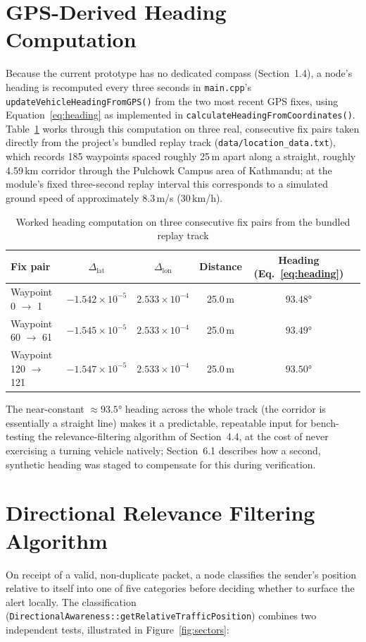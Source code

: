 \documentclass[12pt,a4paper]{report}
\begin{document}
\section{GPS-Derived Heading Computation}
Because the current prototype has no dedicated compass (Section~1.4), a node's heading is recomputed every three seconds in \texttt{main.cpp}'s \texttt{updateVehicleHeadingFromGPS()} from the two most recent GPS fixes, using Equation~\ref{eq:heading} as implemented in \texttt{calculateHeadingFromCoordinates()}. Table~\ref{tab:headingworked} works through this computation on three real, consecutive fix pairs taken directly from the project's bundled replay track (\texttt{data/location\_data.txt}), which records 185 waypoints spaced roughly 25\,m apart along a straight, roughly 4.59\,km corridor through the Pulchowk Campus area of Kathmandu; at the module's fixed three-second replay interval this corresponds to a simulated ground speed of approximately 8.3\,m/s (30\,km/h).

\begin{table}[H]
\centering
\caption{Worked heading computation on three consecutive fix pairs from the bundled replay track}
\label{tab:headingworked}
\begin{tabular}{@{}lccccc@{}}
\toprule
\textbf{Fix pair} & $\Delta_{\text{lat}}$ & $\Delta_{\text{lon}}$ & Distance & Heading (Eq.~\ref{eq:heading}) \\
\midrule
Waypoint 0 $\to$ 1   & $-1.542\times10^{-5}$ & $2.533\times10^{-4}$ & 25.0\,m & $93.48°$ \\
Waypoint 60 $\to$ 61 & $-1.545\times10^{-5}$ & $2.533\times10^{-4}$ & 25.0\,m & $93.49°$ \\
Waypoint 120 $\to$ 121 & $-1.547\times10^{-5}$ & $2.533\times10^{-4}$ & 25.0\,m & $93.50°$ \\
\bottomrule
\end{tabular}
\end{table}

The near-constant $\approx 93.5°$ heading across the whole track (the corridor is essentially a straight line) makes it a predictable, repeatable input for bench-testing the relevance-filtering algorithm of Section~4.4, at the cost of never exercising a turning vehicle natively; Section~6.1 describes how a second, synthetic heading was staged to compensate for this during verification.

\section{Directional Relevance Filtering Algorithm}
On receipt of a valid, non-duplicate packet, a node classifies the sender's position relative to itself into one of five categories before deciding whether to surface the alert locally. The classification (\texttt{DirectionalAwareness::getRelativeTrafficPosition}) combines two independent tests, illustrated in Figure~\ref{fig:sectors}:
\end{document}
